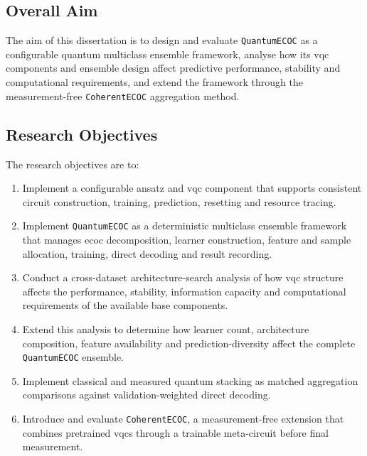 \documentclass[]{UCD_CS_MSc_AAI_Report}
\begin{document}
\subsection{Overall Aim}

The aim of this dissertation is to design and evaluate \texttt{QuantumECOC} as a configurable quantum multiclass ensemble framework, analyse how its \ac{vqc} components and ensemble design affect predictive performance, stability and computational requirements, and extend the framework through the measurement-free \texttt{CoherentECOC} aggregation method.

\subsection{Research Objectives}

The research objectives are to:

\begin{enumerate}
    \item Implement a configurable ansatz and \ac{vqc} component that supports consistent circuit construction, training, prediction, resetting and resource tracing.
    \item Implement \texttt{QuantumECOC} as a deterministic multiclass ensemble framework that manages \ac{ecoc} decomposition, learner construction, feature and sample allocation, training, direct decoding and result recording.
    \item Conduct a cross-dataset \gls{architecture-search} analysis of how \ac{vqc} structure affects the performance, stability, information capacity and computational requirements of the available base components.
    \item Extend this analysis to determine how learner count, architecture composition, feature availability and \gls{prediction-diversity} affect the complete \texttt{QuantumECOC} ensemble.
    \item Implement classical and measured quantum stacking as matched aggregation comparisons against validation-weighted direct decoding.
    \item Introduce and evaluate \texttt{CoherentECOC}, a measurement-free extension that combines pretrained \acp{vqc} through a trainable meta-circuit before final measurement.
\end{enumerate}
\end{document}
